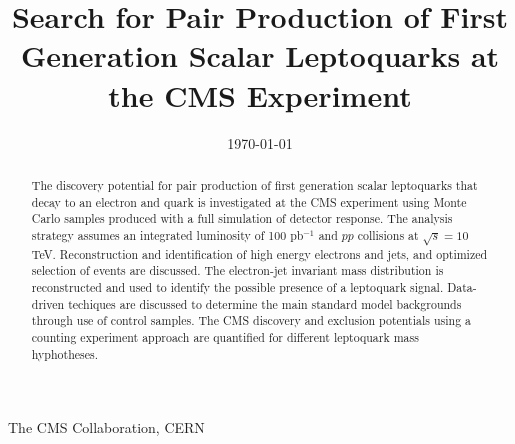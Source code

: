 \documentclass{cmspaper}
\begin{document}
\begin{linenumbers}

\begin{titlepage}



\date{\today}

\title{Search for Pair Production of First Generation Scalar Leptoquarks at the CMS Experiment}


  \begin{Authlist}
    The CMS Collaboration, CERN
  \end{Authlist}


  \begin{abstract}
    The discovery potential for pair production of first generation scalar leptoquarks that 
    decay to an electron and quark is investigated 
    at the CMS experiment using Monte Carlo samples produced with a full simulation of detector response.  
    The analysis strategy assumes an integrated luminosity of 100 pb$^{-1}$ and $pp$ collisions 
    at $\sqrt{s}=10$ TeV.
    Reconstruction and identification of high energy electrons and jets, 
    and optimized selection of events are discussed.
    The electron-jet invariant mass distribution is reconstructed
    and used to identify the possible presence of a leptoquark signal.
    Data-driven techiques are discussed to determine the main standard model backgrounds through use of 
    control samples. The CMS discovery and exclusion potentials using a counting experiment approach 
    are quantified for different leptoquark mass hyphotheses.

  \end{abstract} 

\end{titlepage}

\setcounter{page}{2}%


\end{linenumbers}
\end{document}
